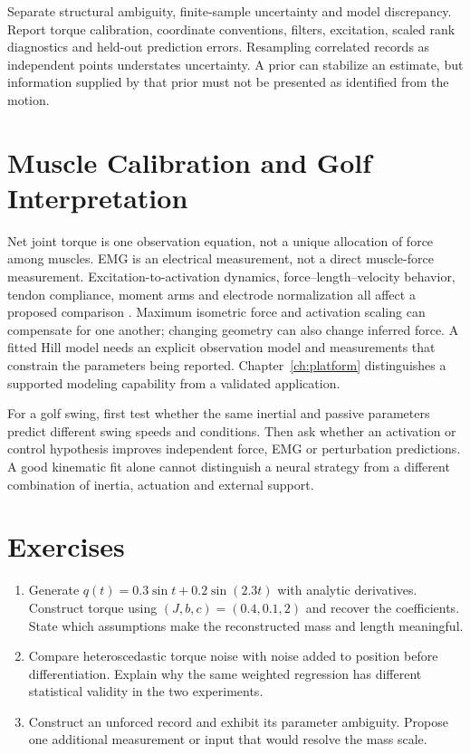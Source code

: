 Separate structural ambiguity, finite-sample uncertainty and model discrepancy.
Report torque calibration, coordinate conventions, filters, excitation,
scaled rank diagnostics and held-out prediction errors. Resampling correlated
records as independent points understates uncertainty. A prior can stabilize
an estimate, but information supplied by that prior must not be presented as
identified from the motion.

\section{Muscle Calibration and Golf Interpretation}

Net joint torque is one observation equation, not a unique allocation of force
among muscles. EMG is an electrical measurement, not a direct muscle-force
measurement. Excitation-to-activation dynamics, force--length--velocity behavior,
tendon compliance, moment arms and electrode normalization all affect a proposed
comparison \cite{CEINMSCalibrationReview}. Maximum isometric force and activation scaling can compensate for
one another; changing geometry can also change inferred force. A fitted Hill
model needs an explicit observation model and measurements that constrain the
parameters being reported. Chapter~\ref{ch:platform} distinguishes a supported
modeling capability from a validated application.

For a golf swing, first test whether the same inertial and passive parameters
predict different swing speeds and conditions. Then ask whether an activation
or control hypothesis improves independent force, EMG or perturbation
predictions. A good kinematic fit alone cannot distinguish a neural strategy
from a different combination of inertia, actuation and external support.

\section*{Exercises}
\begin{enumerate}
  \item Generate $q(t)=0.3\sin t+0.2\sin(2.3t)$ with analytic derivatives.
  Construct torque using $(J,b,c)=(0.4,0.1,2)$ and recover the coefficients.
  State which assumptions make the reconstructed mass and length meaningful.
  \item Compare heteroscedastic torque noise with noise added to position before
  differentiation. Explain why the same weighted regression has different
  statistical validity in the two experiments.
  \item Construct an unforced record and exhibit its parameter ambiguity.
  Propose one additional measurement or input that would resolve the mass scale.
\end{enumerate}
